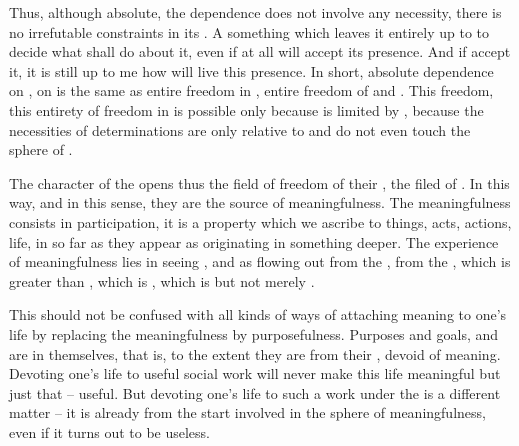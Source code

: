 {{{      \pa Thus, although absolute, the dependence does not involve any
      necessity, there is no irrefutable constraints in its .  A
        something which leaves it entirely up to
       to decide what  shall do about it, even if  at all
      will accept its presence. And if  accept it, it is still up to me
      how  will live this presence. In short, absolute dependence on
      , on  is the same as entire freedom in
      , entire freedom of  and .  This
      freedom, this entirety of freedom in  is possible only
      because  is limited by , because the
      necessities of  determinations are only relative to  and do not even touch the sphere of .
      
      \pa The  character of the  opens thus the field
      of freedom of their , the filed of . In this
      way, and in this sense, they are the source of meaningfulness.  The
      meaningfulness consists in participation, it is a property which we
      ascribe to  things, acts, actions, life, in so far as they
      appear as originating in something deeper.
%
%
      The experience of meaningfulness lies in seeing ,  and  as flowing out from the , from the
      , which is greater than , which is , which is
       but not merely .
      
      \pa This should not be confused with all kinds of ways of attaching
      meaning to one's life by replacing the meaningfulness by purposefulness.
      Purposes and goals,  and  are in themselves, that is,
      to the extent they are  from their , devoid of
      meaning.  Devoting one's life to useful social work will never make this
      life meaningful but just that -- useful.  But devoting one's life to such
      a work under the   is a different matter -- it
      is already from the start involved in the sphere of meaningfulness, even if
      it turns out to be useless.    }}
} %

